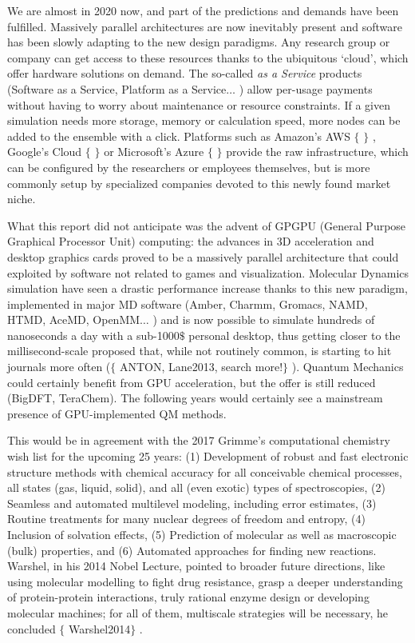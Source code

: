 We are almost in 2020 now, and part of the predictions and demands have been fulfilled. Massively parallel architectures are now inevitably present and software has been slowly adapting to the new design paradigms. Any research group or company can get access to these resources thanks to the ubiquitous ‘cloud’, which offer hardware solutions on demand. The so-called \textit{as a Service}  products (Software as a Service, Platform as a Service$ \ldots $ ) allow per-usage payments without having to worry about maintenance or resource constraints. If a given simulation needs more storage, memory or calculation speed, more nodes can be added to the ensemble with a click. Platforms such as Amazon’s AWS $ \{ $ $ \} $ , Google’s Cloud $ \{ $ $ \} $  or Microsoft’s Azure $ \{ $ $ \} $  provide the raw infrastructure, which can be configured by the researchers or employees themselves, but is more commonly setup by specialized companies devoted to this newly found market niche.

What this report did not anticipate was the advent of GPGPU (General Purpose Graphical Processor Unit) computing: the advances in 3D acceleration and desktop graphics cards proved to be a massively parallel architecture that could exploited by software not related to games and visualization. Molecular Dynamics simulation have seen a drastic performance increase thanks to this new paradigm, implemented in major MD software (Amber, Charmm, Gromacs, NAMD, HTMD, AceMD, OpenMM$ \ldots $ ) and is now possible to simulate hundreds of nanoseconds a day with a sub-1000$\$$  personal desktop, thus getting closer to the millisecond-scale proposed that, while not routinely common, is starting to hit journals more often ($ \{ $ ANTON, Lane2013, search more!$ \} $ ). Quantum Mechanics could certainly benefit from GPU acceleration, but the offer is still reduced (BigDFT, TeraChem). The following years would certainly see a mainstream presence of GPU-implemented QM methods.

This would be in agreement with the 2017 Grimme’s computational chemistry wish list for the upcoming 25 years: (1) Development of robust and fast electronic structure methods with chemical accuracy for all conceivable chemical processes, all states (gas, liquid, solid), and all (even exotic) types of spectroscopies, (2) Seamless and automated multilevel modeling, including error estimates, (3) Routine treatments for many nuclear degrees of freedom and entropy, (4) Inclusion of solvation effects, (5) Prediction of molecular as well as macroscopic (bulk) properties, and (6) Automated approaches for finding new reactions. Warshel, in his 2014 Nobel Lecture, pointed to broader future directions, like using molecular modelling to fight drug resistance, grasp a deeper understanding of protein-protein interactions, truly rational enzyme design or developing molecular machines; for all of them, multiscale strategies will be necessary, he concluded $ \{ $ Warshel2014$ \} $ .

